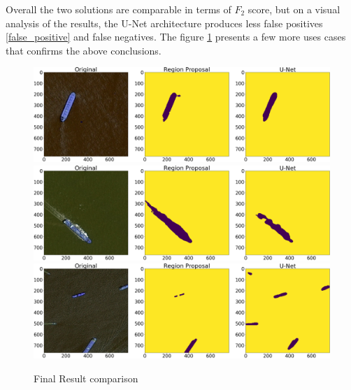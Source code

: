 Overall the two solutions are comparable in terms of $F_2$ score, but on a visual analysis of the results, the U-Net architecture produces less false positives \ref{false_positive} and false negatives. The figure \ref{Final_Result} presents a few more uses cases that confirms the above conclusions.

\begin{figure}
	\includegraphics[width=\textwidth]{Pictures/016Comparison3.png}
	\includegraphics[width=\textwidth]{Pictures/016Comparison5.png}
	\includegraphics[width=\textwidth]{Pictures/016Comparison6.png}
	\caption{Final Result comparison}
	\label{Final_Result}
\end{figure}